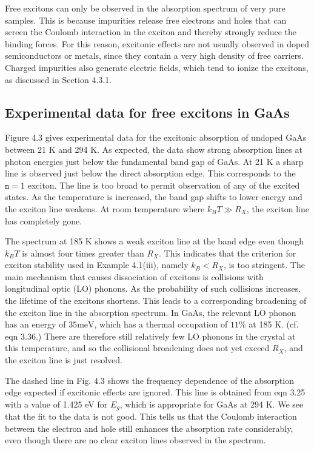 \documentclass[12pt]{book}
\begin{document}
Free excitons can only be observed in the absorption spectrum of very pure samples. This is because impurities release free electrons and holes that can screen the Coulomb interaction in the exciton and thereby strongly reduce the binding forces. For this reason, excitonic effects are not usually observed in doped semiconductors or metals, since they contain a very high density of free carriers. Charged impurities also generate electric fields, which tend to ionize the excitons, as discussed in Section 4.3.1.

\subsection{Experimental data for free excitons in GaAs}

Figure 4.3 gives experimental data for the excitonic absorption of undoped GaAs between 21 K and 294 K. As expected, the data show strong absorption lines at photon energies just below the fundamental band gap of GaAs. At 21 K a sharp line is observed just below the direct absorption edge. This corresponds to the $\texttt{n} = 1$ exciton. The line is too broad to permit observation of any of the excited states. As the temperature is increased, the band gap shifts to lower energy and the exciton line weakens. At room temperature where $k_BT\gg R_X$, the exciton line has completely gone.

The spectrum at 185 K shows a weak exciton line at the band edge even though $k_BT$ is almost four times greater than $R_X$. This indicates that the criterion for exciton stability used in Example 4.1(iii), namely $k_B<R_X$, is too stringent. The main mechanism that causes dissociation of excitons is collisions with longitudinal optic (LO) phonons. As the probability of such collisions increases, the lifetime of the excitons shortens. This leads to a corresponding broadening of the exciton line in the absorption spectrum. In GaAs, the relevant LO phonon has an energy of $\mathrm{35 meV}$, which has a thermal occupation of $11\%$ at 185 K. (cf. eqn 3.36.) There are therefore still relatively few LO phonons in the crystal at this temperature, and so the collisional broadening does not yet exceed $R_X$, and the exciton line is just resolved.

The dashed line in Fig. 4.3 shows the frequency dependence of the absorption edge expected if excitonic effects are ignored. This line is obtained from eqn 3.25 with a value of 1.425 eV for $E_g$, which is appropriate for GaAs at 294 K. We see that the fit to the data is not good. This tells us that the Coulomb interaction between the electron and hole still enhances the absorption rate considerably, even though there are no clear exciton lines observed in the spectrum.
\end{document}
